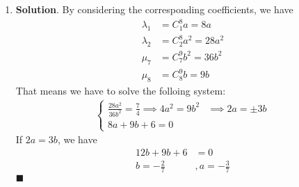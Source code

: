 \documentclass[12pt]{article}
\newenvironment*{sol}{\par \textbf{Solution}.}{\hfill$\blacksquare$}
\begin{document}
\begin{enumerate}
\begin{enumerate}
\begin{sol}
                Thus, by the principle of Mathematical Induction, $P(n)$ is true for all positive integer $n$.
            \end{sol}
            \item \begin{sol}
                \begin{align*}
                    \sum_{n=1}^{2m}A_n&=\sum_{n=1}^{2m}(-1)^{n-1}B_n\\
                    &=\sum_{n=1}^{m}(B_{2n-1}-B_{2n})\\
                    &=\sum_{n=1}^{m}(-2n)\\
                    &=-2\sum_{n=1}^{m}n\\
                    &=-2 B_m\\
                    &=-m(m+1)\\
                    \sum_{n=1}^{2m+1}A_n&=-m(m+1)+A_{2m+1}\\
                    &=-m(m+1)+B_{2m+1}\\
                    &=-m(m+1)+(m+1)(2m+1)\\
                    &=(m+1)^2
                \end{align*}
            \end{sol}
        \end{enumerate}
        \item \begin{sol}
            By considering the corresponding coefficients, we have
            \begin{align*}
                \lambda_1&=C_1^8a=8a\\
                \lambda_2&=C_2^8a^2=28a^2\\
                \mu_7&=C_7^9b^2=36b^2\\
                \mu_8&=C_8^9b=9b
            \end{align*}
            That means we have to solve the folloing system:\begin{align*}
                \begin{cases}
                    \frac{28a^2}{36b^2}=\frac{7}{4}\implies 4a^2=9b^2&\implies 2a=\pm 3b\\
                    8a+9b+6=0
                \end{cases}
            \end{align*}
            If $2a=3b$, we have \begin{align*}
                12b+9b+6&=0\\
                b=-\frac{2}{7} &,a=-\frac{3}{7}

\end{align*}
\end{sol}
\end{enumerate}
\end{document}
